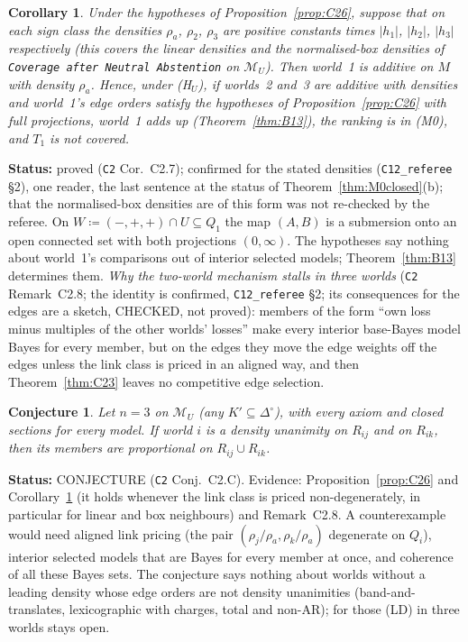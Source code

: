 \documentclass[11pt]{article}
\newtheorem{corollary}[theorem]{Corollary}
\newtheorem{conjecture}[theorem]{Conjecture}
\theoremstyle{definition}
\theoremstyle{remark}
\newcommand{\Di}{\Delta^{\circ}}
\newcommand{\M}{\mathcal M}
\newcommand{\src}[1]{\texttt{#1}}
\newcommand{\status}[1]{\par\smallskip\noindent\textbf{Status:} #1\par\smallskip}
\begin{document}
\begin{corollary}\label{cor:C27}
Under the hypotheses of Proposition~\ref{prop:C26}, suppose that on each sign class the densities $\rho_a$, $\rho_2$, $\rho_3$ are positive constants times $|h_1|$, $|h_2|$, $|h_3|$ respectively (this covers the linear densities and the normalised-box densities of \src{Coverage after Neutral Abstention} on $\M_U$). Then world~1 is additive on $M$ with density $\rho_a$. Hence, under (H$_U$), if worlds~2 and~3 are additive with densities and world~1's edge orders satisfy the hypotheses of Proposition~\ref{prop:C26} with full projections, world~1 adds up (Theorem~\ref{thm:B13}), the ranking is in (M0), and $T_1$ is not covered.
\end{corollary}
\status{proved (\src{C2} Cor.~C2.7); confirmed for the stated densities (\src{C12\_referee} \S2), one reader, the last sentence at the status of Theorem~\ref{thm:M0closed}(b); that the normalised-box densities are of this form was not re-checked by the referee. On $W\coloneqq(-,+,+)\cap U\subseteq Q_1$ the map $(A,B)$ is a submersion onto an open connected set with both projections $(0,\infty)$. The hypotheses say nothing about world~1's comparisons out of interior selected models; Theorem~\ref{thm:B13} determines them. \emph{Why the two-world mechanism stalls in three worlds} (\src{C2} Remark~C2.8; the identity is confirmed, \src{C12\_referee} \S2; its consequences for the edges are a sketch, CHECKED, not proved): members of the form ``own loss minus multiples of the other worlds' losses'' make every interior base-Bayes model Bayes for every member, but on the edges they move the edge weights off the edges unless the link class is priced in an aligned way, and then Theorem~\ref{thm:C23} leaves no competitive edge selection.}

\begin{conjecture}\label{conj:C2C}
Let $n=3$ on $\M_U$ (any $K'\subseteq\Di$), with every axiom and closed sections for every model. If world $i$ is a density unanimity on $R_{ij}$ and on $R_{ik}$, then its members are proportional on $R_{ij}\cup R_{ik}$.
\end{conjecture}
\status{CONJECTURE (\src{C2} Conj.~C2.C). Evidence: Proposition~\ref{prop:C26} and Corollary~\ref{cor:C27} (it holds whenever the link class is priced non-degenerately, in particular for linear and box neighbours) and Remark~C2.8. A counterexample would need aligned link pricing (the pair $(\rho_j/\rho_a,\rho_k/\rho_a)$ degenerate on $Q_i$), interior selected models that are Bayes for every member at once, and coherence of all these Bayes sets. The conjecture says nothing about worlds without a leading density whose edge orders are not density unanimities (band-and-translates, lexicographic with charges, total and non-AR); for those (LD) in three worlds stays open.}
\end{document}
